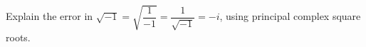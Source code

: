 Explain the error in $\sqrt{-1}=\sqrt{\dfrac{1}{-1}}=\dfrac{1}{\sqrt{-1}}=-i$, using principal complex square roots.
